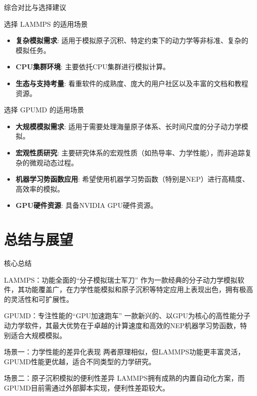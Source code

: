 \documentclass{beamer}
\begin{document}
\begin{frame}{综合对比与选择建议}
    \begin{block}{选择 LAMMPS 的适用场景}
        \begin{itemize}
            \item \textbf{复杂模拟需求}: 适用于模拟原子沉积、特定约束下的动力学等非标准、复杂的模拟任务。
            \item \textbf{CPU集群环境}: 主要依托CPU集群进行模拟计算。
            \item \textbf{生态与支持考量}: 看重软件的成熟度、庞大的用户社区以及丰富的文档和教程资源。
        \end{itemize}
    \end{block}
    \begin{block}{选择 GPUMD 的适用场景}
        \begin{itemize}
            \item \textbf{大规模模拟需求}: 适用于需要处理海量原子体系、长时间尺度的分子动力学模拟。
            \item \textbf{宏观性质研究}: 主要研究体系的宏观性质（如热导率、力学性能），而非追踪复杂的微观动态过程。
            \item \textbf{机器学习势函数应用}: 希望使用机器学习势函数（特别是NEP）进行高精度、高效率的模拟。
            \item \textbf{GPU硬件资源}: 具备NVIDIA GPU硬件资源。
        \end{itemize}
    \end{block}
\end{frame}

\section{总结与展望}

\begin{frame}{核心总结}
    \begin{block}{LAMMPS：功能全面的“分子模拟瑞士军刀”}
        作为一款经典的分子动力学模拟软件，其功能覆盖广，在力学性能模拟和原子沉积等特定应用上表现出色，拥有极高的灵活性和可扩展性。
    \end{block}
    \begin{block}{GPUMD：专注性能的“GPU加速跑车”}
        一款新兴的、以GPU为核心的高性能分子动力学软件，其最大优势在于卓越的计算速度和高效的NEP机器学习势函数，特别适合大规模模拟。
    \end{block}
    \begin{block}{场景一：力学性能的差异化表现}
        两者原理相似，但LAMMPS功能更丰富灵活，GPUMD性能更优越，适合不同类型的力学研究。
    \end{block}
    \begin{block}{场景二：原子沉积模拟的便利性差异}
        LAMMPS拥有成熟的内置自动化方案，而GPUMD目前需通过外部脚本实现，便利性差距较大。
    \end{block}
\end{frame}
\end{document}
